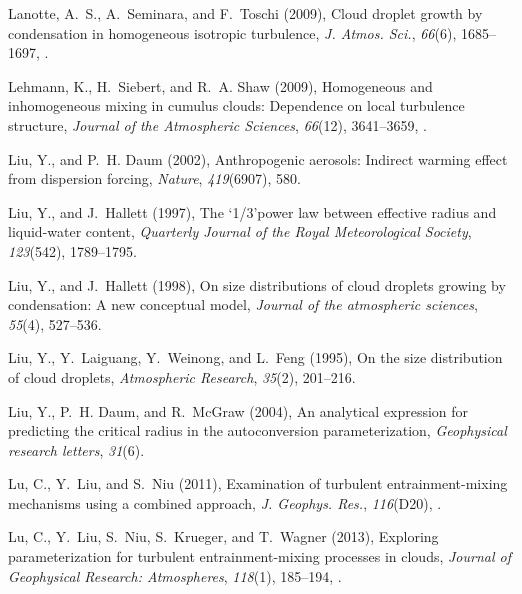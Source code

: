 \documentclass[draft,linenumbers]{AGUJournal}
\begin{document}
\begin{thebibliography}{60}
Lanotte, A.~S., A.~Seminara, and F.~Toschi (2009), Cloud droplet growth by
  condensation in homogeneous isotropic turbulence, \textit{J. Atmos. Sci.},
  \textit{66}(6), 1685--1697, .

Lehmann, K., H.~Siebert, and R.~A. Shaw (2009{}), Homogeneous and
  inhomogeneous mixing in cumulus clouds: Dependence on local turbulence
  structure, \textit{Journal of the Atmospheric Sciences}, \textit{66}(12),
  3641--3659, .

Liu, Y., and P.~H. Daum (2002), Anthropogenic aerosols: Indirect warming effect
  from dispersion forcing, \textit{Nature}, \textit{419}(6907), 580.

Liu, Y., and J.~Hallett (1997), The ‘1/3’power law between effective radius
  and liquid-water content, \textit{Quarterly Journal of the Royal
  Meteorological Society}, \textit{123}(542), 1789--1795.

Liu, Y., and J.~Hallett (1998), On size distributions of cloud droplets growing
  by condensation: A new conceptual model, \textit{Journal of the atmospheric
  sciences}, \textit{55}(4), 527--536.

Liu, Y., Y.~Laiguang, Y.~Weinong, and L.~Feng (1995), On the size distribution
  of cloud droplets, \textit{Atmospheric Research}, \textit{35}(2), 201--216.

Liu, Y., P.~H. Daum, and R.~McGraw (2004), An analytical expression for
  predicting the critical radius in the autoconversion parameterization,
  \textit{Geophysical research letters}, \textit{31}(6).

Lu, C., Y.~Liu, and S.~Niu (2011), Examination of turbulent entrainment-mixing
  mechanisms using a combined approach, \textit{J. Geophys. Res.},
  \textit{116}(D20), .

Lu, C., Y.~Liu, S.~Niu, S.~Krueger, and T.~Wagner (2013), Exploring
  parameterization for turbulent entrainment-mixing processes in clouds,
  \textit{Journal of Geophysical Research: Atmospheres}, \textit{118}(1),
  185--194, .


\end{thebibliography}
\end{document}
